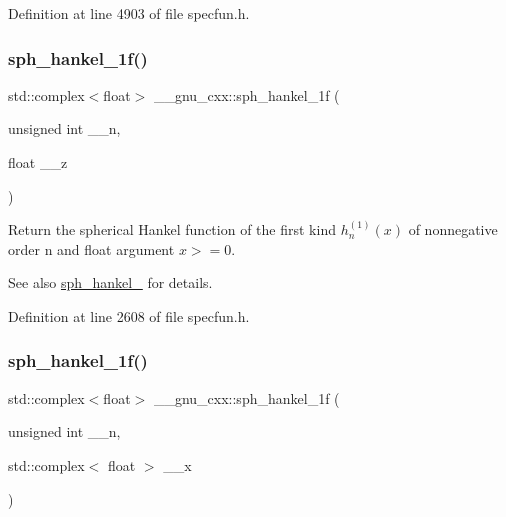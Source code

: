 Definition at line 4903 of file specfun.\+h.

\mbox{\label{group__gnu__math__spec__func_ga70d4fc01069f3f0ac0e3b52fe1dffea4}} 
\subsubsection{\texorpdfstring{sph\+\_\+hankel\+\_\+1f()}{sph\_hankel\_1f()}\hspace{0.1cm}{\footnotesize\ttfamily [1/2]}}
{\footnotesize\ttfamily std\+::complex$<$float$>$ \+\_\+\+\_\+gnu\+\_\+cxx\+::sph\+\_\+hankel\+\_\+1f (\begin{DoxyParamCaption}\item[{unsigned int}]{\+\_\+\+\_\+n,  }\item[{float}]{\+\_\+\+\_\+z }\end{DoxyParamCaption})\hspace{0.3cm}{\ttfamily [inline]}}

Return the spherical Hankel function of the first kind $ h^{(1)}_n(x) $ of nonnegative order n and {\ttfamily float} argument $ x >= 0 $.

\begin{DoxySeeAlso}{See also}
\hyperlink{group__gnu__math__spec__func_ga4424f565fb224ab88b177beb65d08305}{sph\+\_\+hankel\+\_} for details. 
\end{DoxySeeAlso}


Definition at line 2608 of file specfun.\+h.

\mbox{\label{group__gnu__math__spec__func_gadbb875cd50abb62ac75386143486bb2c}} 
\subsubsection{\texorpdfstring{sph\+\_\+hankel\+\_\+1f()}{sph\_hankel\_1f()}\hspace{0.1cm}{\footnotesize\ttfamily [2/2]}}
{\footnotesize\ttfamily std\+::complex$<$float$>$ \+\_\+\+\_\+gnu\+\_\+cxx\+::sph\+\_\+hankel\+\_\+1f (\begin{DoxyParamCaption}\item[{unsigned int}]{\+\_\+\+\_\+n,  }\item[{std\+::complex$<$ float $>$}]{\+\_\+\+\_\+x }\end{DoxyParamCaption})\hspace{0.3cm}{\ttfamily [inline]}}

